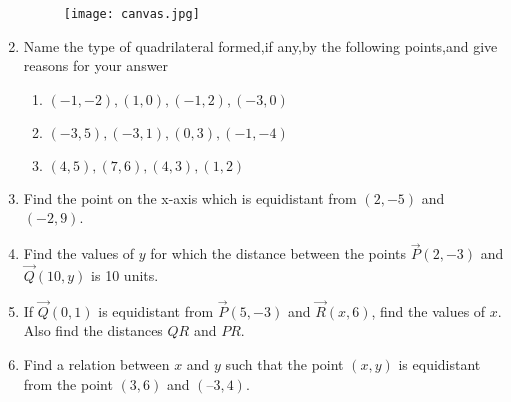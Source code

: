\documentclass[12pt]{article}
\begin{document}
\begin{enumerate}[label=\thesection.\arabic*,ref=\thesection.\theenumi]
\begin{figure}[!h]
\centering
  \texttt{[image: canvas.jpg]}
 \caption{}
\label{fig:10/7/4/8Fig3}
\end{figure}
\fi
\item Name the type of quadrilateral formed,if any,by the following points,and give reasons for your answer
\begin{enumerate}
\item $(-1,-2),(1,0),(-1,2),(-3,0)$
\item $(-3,5),(-3,1),(0,3),(-1,-4)$
\item $(4,5),(7,6),(4,3),(1,2)$
\end{enumerate}
\solution
		
\item Find the point on the x-axis which is equidistant from $(2,-5)$ and $(-2,9)$.
	\\
\solution
		
\item Find the values of $y$ for which the distance between the points                  $\vec{P}(2,-3)$ and $\vec{Q}(10,y)$ is 10 units.
\item  If $\vec{Q}(0, 1)$ is equidistant from $\vec{P}(5, -3)$ and $\vec{R}(x, 6)$, find the values of $x$. Also find the
distances $QR$ and $PR$.
\item  Find a relation between $x$ and $y$ such that the point $(x,y)$ is equidistant from the point
$(3, 6)$ and $(– 3, 4)$.

\end{enumerate}
\end{document}

